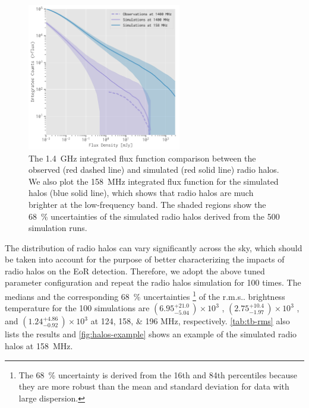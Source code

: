\documentclass[modern]{aastex62}
\makeatletter
\newcommand{\rms}{r.m.s\@ifnextchar.{}{.\@}}
\makeatother
\begin{document}
\begin{figure}
  \centering
  \includegraphics[width=0.6\textwidth]{fluxfunc-simucomp-1400}
  \caption{\label{fig:halos-simucomp}%
    The \SI{1.4}{\GHz} integrated flux function comparison
    between the observed (red dashed line) and simulated (red solid line)
    radio halos.  We also plot the \SI{158}{\MHz} integrated flux function
    for the simulated halos (blue solid line), which shows that radio
    halos are much brighter at the low-frequency band.  The shaded
    regions show the \SI{68}{\percent} uncertainties of the simulated
    radio halos derived from the 500 simulation runs.
  }
\end{figure}

{\color{cyan}%
The distribution of radio halos can vary significantly across the sky,
which should be taken into account for the purpose of better
characterizing the impacts of radio halos on the EoR detection.
Therefore, we adopt the above tuned parameter configuration
and repeat the radio halos simulation for 100 times.
The medians and the corresponding \SI{68}{\percent} uncertainties%
\footnote{The \SI{68}{\percent} uncertainty is derived from the 16th
and 84th percentiles because they are more robust than the mean and
standard deviation for data with large dispersion.}
of the \rms{} brightness temperature for the 100 simulations are
$\left(6.95_{-5.04}^{+21.0}\,\right) \times 10^3$ \si{\mK},
$\left(2.75_{-1.97}^{+10.4}\,\right) \times 10^3$ \si{\mK}, and
$\left(1.24_{-0.92}^{+4.86}\,\right) \times 10^3$ \si{\mK}
at \numlist{124;158;196} \si{\MHz}, respectively.
\autoref{tab:tb-rms} also lists the results and
\autoref{fig:halos-example} shows an example of the simulated radio halos
at \SI{158}{\MHz}.} %
\end{document}
